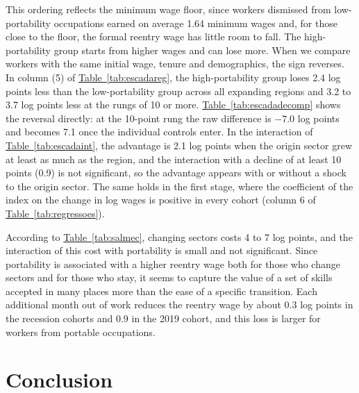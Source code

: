 \documentclass[11pt,a4paper]{article}
\let\secaoorig\section
\renewcommand{\section}{\clearpage\secaoorig}
\begin{document}
This ordering reflects the minimum wage floor, since workers dismissed from low-portability occupations earned on average 1.64 minimum wages and, for those close to the floor, the formal reentry wage has little room to fall. The high-portability group starts from higher wages and can lose more. When we compare workers with the same initial wage, tenure and demographics, the sign reverses. In column (5) of \hyperref[tab:escadareg]{Table~\ref*{tab:escadareg}}, the high-portability group loses 2.4 log points less than the low-portability group across all expanding regions and 3.2 to 3.7 log points less at the rungs of 10 or more. \hyperref[tab:escadadecomp]{Table~\ref*{tab:escadadecomp}} shows the reversal directly: at the 10-point rung the raw difference is $-7.0$ log points and becomes 7.1 once the individual controls enter. In the interaction of \hyperref[tab:escadaint]{Table~\ref*{tab:escadaint}}, the advantage is 2.1 log points when the origin sector grew at least as much as the region, and the interaction with a decline of at least 10 points (0.9) is not significant, so the advantage appears with or without a shock to the origin sector. The same holds in the first stage, where the coefficient of the index on the change in log wages is positive in every cohort (column 6 of \hyperref[tab:regressoes]{Table~\ref*{tab:regressoes}}).

According to \hyperref[tab:salmec]{Table~\ref*{tab:salmec}}, changing sectors costs 4 to 7 log points, and the interaction of this cost with portability is small and not significant. Since portability is associated with a higher reentry wage both for those who change sectors and for those who stay, it seems to capture the value of a set of skills accepted in many places more than the ease of a specific transition. Each additional month out of work reduces the reentry wage by about 0.3 log points in the recession cohorts and 0.9 in the 2019 cohort, and this loss is larger for workers from portable occupations.

\begin{table}[!htb]
\centering
\caption{Reentry wage, sector change and time out of work}
\label{tab:salmec}

\end{table}

\FloatBarrier
\section{Conclusion}
\end{document}
